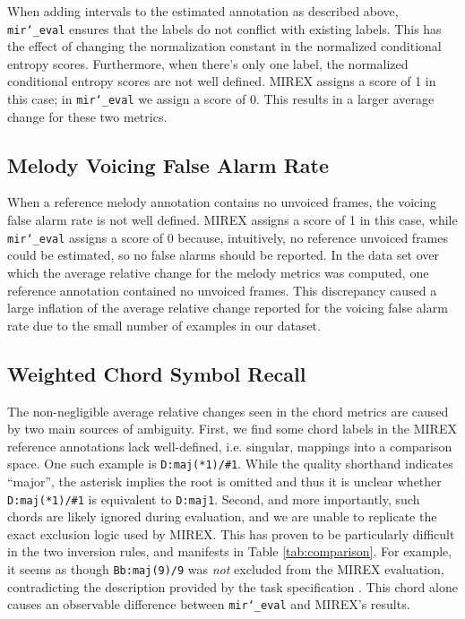 \documentclass{article}
\def\mireval{\texttt{mir\char`_eval}}
\begin{document}
When adding intervals to the estimated annotation as described above, \mireval{} ensures that the labels do not conflict with existing labels.
This has the effect of changing the normalization constant in the normalized conditional entropy scores.
Furthermore, when there's only one label, the normalized conditional entropy scores are not well defined.
MIREX assigns a score of 1 in this case; in \mireval{} we assign a score of 0.
This results in a larger average change for these two metrics.

\subsection{Melody Voicing False Alarm Rate}

When a reference melody annotation contains no unvoiced frames, the voicing false alarm rate is not well defined.
MIREX assigns a score of 1 in this case, while \mireval{} assigns a score of 0 because, intuitively, no reference unvoiced frames could be estimated, so no false alarms should be reported.
In the data set over which the average relative change for the melody metrics was computed, one reference annotation contained no unvoiced frames.
This discrepancy caused a large inflation of the average relative change reported for the voicing false alarm rate due to the small number of examples in our dataset.

\subsection{Weighted Chord Symbol Recall}
The non-negligible average relative changes seen in the chord metrics are caused by two main sources of ambiguity.
First, we find some chord labels in the MIREX reference annotations lack well-defined, i.e. singular, mappings into a comparison space. 
One such example is \texttt{D:maj(*1)/\#1}.
While the quality shorthand indicates ``major'', the asterisk implies the root is omitted and thus it is unclear whether \texttt{D:maj(*1)/\#1} is equivalent to \texttt{D:maj1}.
Second, and more importantly, such chords are likely ignored during evaluation, and we are unable to replicate the exact exclusion logic used by MIREX.
This has proven to be particularly difficult in the two inversion rules, and manifests in Table \ref{tab:comparison}. 
For example, it seems as though \texttt{Bb:maj(9)/9} was \emph{not} excluded from the MIREX evaluation, contradicting the description provided by the task specification \cite{choi2013mirex}.
This chord alone causes an observable difference between \mireval{} and MIREX's results.
\end{document}

